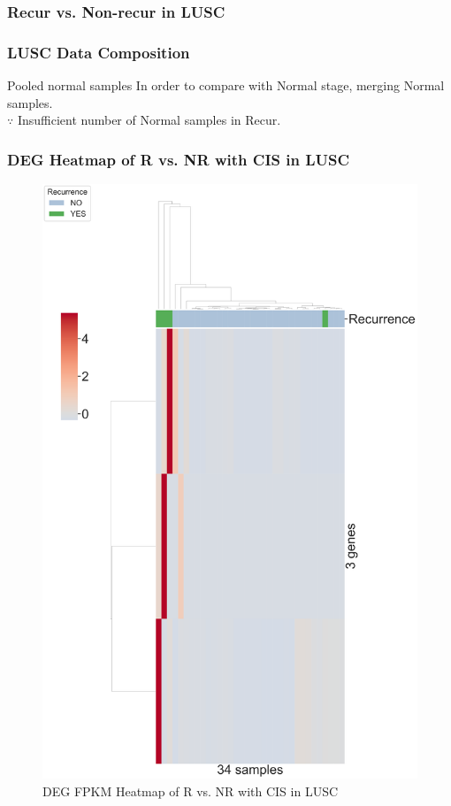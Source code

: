 \documentclass{beamer}
\begin{document}
    \subsubsection{Recur vs. Non-recur in LUSC}
    \begin{frame}
        \frametitle{LUSC Data Composition}

        \begin{table}
            \caption{Number of WTS LUSC samples}
            \resizebox{!}{0.25 \textheight}
            {}
        \end{table}

        \begin{block}{Pooled normal samples}
            In order to compare with Normal stage, merging Normal samples. \\
            $\because$ Insufficient number of Normal samples in Recur.
        \end{block}
    \end{frame}

    \begin{frame}
        \frametitle{DEG Heatmap of R vs. NR with CIS in LUSC}

        \begin{figure}
            \includegraphics[width=0.35 \linewidth]{figures/DEG/Cluster/STAR.FPKM.SQC.CIS.Recur.pdf}
            \caption{DEG FPKM Heatmap of R vs. NR with CIS in LUSC}
        \end{figure}
    \end{frame}
\end{document}
